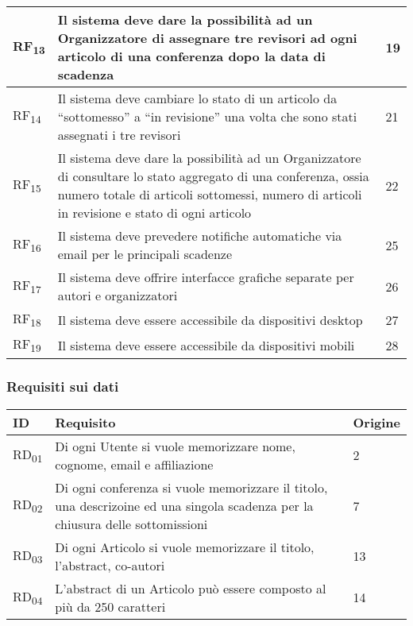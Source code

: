 \begin{tabular}{|p{1cm}|p{9cm}|p{1cm}|}
  \hline
  RF\textsubscript{13} & Il sistema deve dare la possibilità ad un Organizzatore di assegnare tre revisori ad ogni articolo di una conferenza dopo la data di scadenza & 19 \\
  \hline
  RF\textsubscript{14} & Il sistema deve cambiare lo stato di un articolo da ``sottomesso'' a ``in revisione'' una volta che sono stati assegnati i tre revisori & 21\\
  \hline
  RF\textsubscript{15} & Il sistema deve dare la possibilità ad un Organizzatore di consultare lo stato aggregato di una conferenza, ossia numero totale di articoli sottomessi, numero di articoli in revisione e stato di ogni articolo & 22 \\
  \hline
  RF\textsubscript{16} & Il sistema deve prevedere notifiche automatiche via email per le principali scadenze & 25 \\
  \hline
  RF\textsubscript{17} & Il sistema deve offrire interfacce grafiche separate per autori e organizzatori & 26\\
  \hline
  RF\textsubscript{18} & Il sistema deve essere accessibile da dispositivi desktop & 27\\
  \hline
  RF\textsubscript{19} & Il sistema deve essere accessibile da dispositivi mobili & 28\\
  \hline
\end{tabular}
\subsubsection{Requisiti sui dati}
\label{sec:requisiti_dati}
\begin{tabular}{|p{1cm}|p{9cm}|p{1cm}|}
  \hline
  \rowcolor{SkyBlue}
  ID & Requisito & Origine \\
  \hline
  \hline
  RD\textsubscript{01} & Di ogni Utente si vuole memorizzare nome, cognome, email e affiliazione & 2 \\
  \hline
  RD\textsubscript{02} & Di ogni conferenza si vuole memorizzare il titolo, una descrizoine ed una singola scadenza per la chiusura delle sottomissioni & 7\\
  \hline
  RD\textsubscript{03} & Di ogni Articolo si vuole memorizzare il titolo, l'abstract, co-autori & 13 \\
  \hline
  RD\textsubscript{04} & L'abstract di un Articolo può essere composto al più da 250 caratteri & 14 \\
  \hline
\end{tabular}
